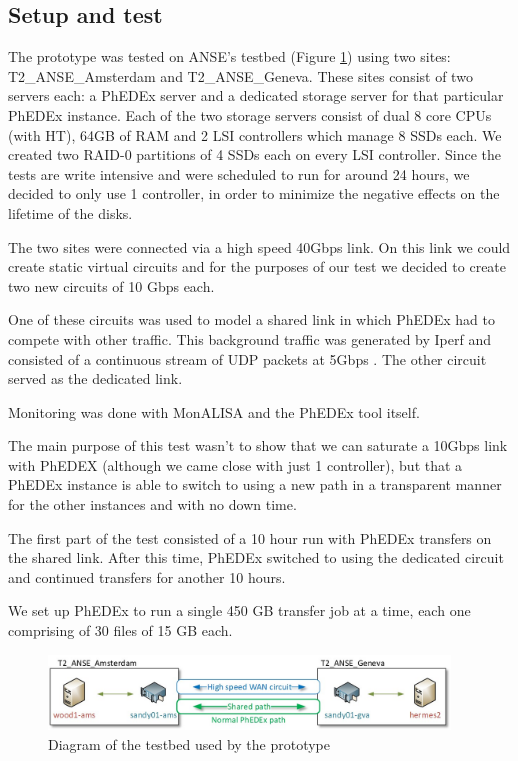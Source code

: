 \subsection{Setup and test}
The prototype was tested on ANSE's testbed (Figure \ref{fig:testbed}) using 
two sites: T2\_ANSE\_Amsterdam and T2\_ANSE\_Geneva. These sites consist of two
 servers each: a PhEDEx server and a dedicated storage server for that particular 
 PhEDEx instance. Each of the two storage servers consist of dual 8 core CPUs 
 (with HT), 64GB of RAM and 2 LSI controllers which manage 8 SSDs each. We created 
 two RAID-0 partitions of 4 SSDs each on every LSI controller. Since the tests are write 
 intensive and were scheduled to run for around 24 hours, we decided to only use 
 1 controller, in order to minimize the negative effects on the lifetime of the disks.

The two sites were connected via a high speed 40Gbps link. On this link we could create
static virtual circuits and for the purposes of our test we decided to create two new
circuits of 10 Gbps each.

One of these circuits was used to model a shared link in which PhEDEx had to compete 
with other traffic. This background traffic was generated by Iperf and consisted of a 
continuous stream of UDP packets at 5Gbps . The other circuit served as the dedicated
link.

Monitoring was done with MonALISA and the PhEDEx tool itself.

The main purpose of this test wasn't to show that we can saturate a 10Gbps link with
PhEDEX (although we came close with just 1 controller), but that a PhEDEx instance 
is able to switch to using a new path in a transparent manner for the other instances
and with no down time. 

The first part of the test consisted of a 10 hour run with PhEDEx transfers on the 
shared link. After this time, PhEDEx switched to using the dedicated circuit and
continued transfers for another 10 hours.

We set up PhEDEx to run a single 450 GB transfer job at a time, each one 
comprising of 30 files of 15 GB each. 

\begin{figure}[h]
  \centering
  \includegraphics[width=0.95\textwidth]{Figures/FileDownload_ANSE_Testbed}
  \caption{Diagram of the testbed used by the prototype}
  \label{fig:testbed}
\end{figure} 
\

